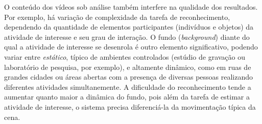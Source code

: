 %
O conteúdo dos vídeos sob análise também interfere na qualidade dos resultados. Por exemplo, há variação de complexidade da tarefa de reconhecimento, dependendo da quantidade de elementos participantes (indivíduos e objetos) da atividade de interesse e seu grau de interação.%
O fundo (\emph{background}) diante do qual a atividade de interesse se desenrola é outro elemento significativo, podendo variar entre \emph{estático}, típico de ambientes controlados (estúdio de gravação ou laboratório de pesquisa, por exemplo), e altamente dinâmico, como em ruas de grandes cidades ou áreas abertas com a presença de diversas pessoas realizando diferentes atividades simultanemente. A dificuldade do reconhecimento tende a aumentar quanto maior a dinâmica do fundo, pois além da tarefa de estimar a atividade de interesse, o sistema precisa diferenciá-la da movimentação típica da cena.
%

